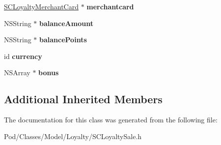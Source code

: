 \begin{DoxyCompactItemize}
\item 
\hyperlink{interface_s_c_loyalty_merchant_card}{S\+C\+Loyalty\+Merchant\+Card} $\ast$ {\bfseries merchantcard}\hypertarget{interface_s_c_loyalty_sale_a82b44f575cbd1a9cc038c0b56a19dcb7}{}\label{interface_s_c_loyalty_sale_a82b44f575cbd1a9cc038c0b56a19dcb7}

\item 
N\+S\+String $\ast$ {\bfseries balance\+Amount}\hypertarget{interface_s_c_loyalty_sale_a24b91a4705a2e8eaf10c2342cccc6ceb}{}\label{interface_s_c_loyalty_sale_a24b91a4705a2e8eaf10c2342cccc6ceb}

\item 
N\+S\+String $\ast$ {\bfseries balance\+Points}\hypertarget{interface_s_c_loyalty_sale_a0063877d1ca727e55317f078193e92a4}{}\label{interface_s_c_loyalty_sale_a0063877d1ca727e55317f078193e92a4}

\item 
id {\bfseries currency}\hypertarget{interface_s_c_loyalty_sale_a4ce7657b2294b8d1366fc878dac25fa6}{}\label{interface_s_c_loyalty_sale_a4ce7657b2294b8d1366fc878dac25fa6}

\item 
N\+S\+Array $\ast$ {\bfseries bonus}\hypertarget{interface_s_c_loyalty_sale_aa8194ffbc17ed99768a2b4b250e4b94f}{}\label{interface_s_c_loyalty_sale_aa8194ffbc17ed99768a2b4b250e4b94f}

\end{DoxyCompactItemize}
\subsection*{Additional Inherited Members}


The documentation for this class was generated from the following file\+:\begin{DoxyCompactItemize}
\item 
Pod/\+Classes/\+Model/\+Loyalty/S\+C\+Loyalty\+Sale.\+h\end{DoxyCompactItemize}
